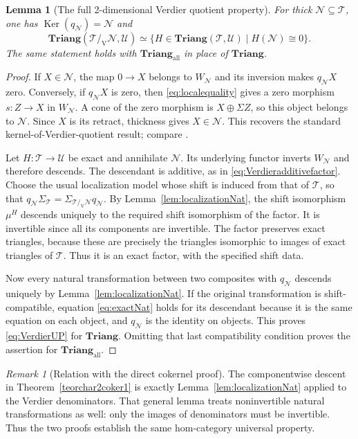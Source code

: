 \documentclass[11pt,reqno,a4paper]{amsart}
\newtheorem{lemma}[theorem]{Lemma}
\theoremstyle{definition}
\theoremstyle{remark}
\newtheorem{remark}[theorem]{Remark}
\newcommand{\N}{\mathcal{N}}
\newcommand{\T}{\mathcal{T}}
\newcommand{\U}{\mathcal{U}}
\newcommand{\0}{\mathbf{0}}
\renewcommand{\1}{\mathbf{1}}
\newcommand{\Triang}{\mathbf{Triang}}
\newcommand{\iso}{\cong}
\newcommand{\Tri}{\Triang}
\newcommand{\TriAll}{\mathbf{Triang}_{\mathrm{all}}}
\newcommand{\vq}[2]{#1/_{\!\mathrm V}#2}
\DeclareMathOperator{\Ker}{Ker}
\begin{document}
\begin{lemma}[The full 2-dimensional Verdier quotient property]\label{lem:VerdierUP}
For thick $\N\subseteq\T$, one has $\Ker(q_{\N})=\N$ and
\begin{equation}\label{eq:VerdierUP}
 \Tri(\vq{\T}{\N},\U)\simeq
 \{H\in\Tri(\T,\U)\mid H(\N)\iso0\}.
\end{equation}
The same statement holds with $\TriAll$ in place of $\Tri$.
\end{lemma}
\begin{proof}
If $X\in\N$, the map $0\to X$ belongs to $W_{\N}$ and its
inversion makes $q_{\N}X$ zero. Conversely, if $q_{\N}X$ is zero,
then \eqref{eq:localequality} gives a zero morphism
$s:Z\to X$ in $W_{\N}$. A cone of the zero morphism is
$X\oplus\Sigma Z$, so this object belongs to $\N$. Since $X$ is
its retract, thickness gives $X\in\N$. This recovers the standard
kernel-of-Verdier-quotient result; compare
\cite[Lemma 13.6.9, Tag 05RK]{StacksTriQuotientKernel}.

Let $H:\T\to\U$ be exact and annihilate $\N$. Its underlying
functor inverts $W_{\N}$ and therefore descends. The descendant is
additive, as in \eqref{eq:Verdieradditivefactor}. Choose the usual
localization model whose shift is induced from that of $\T$, so that
$q_{\N}\Sigma_{\T}=\Sigma_{\vq{\T}{\N}}q_{\N}$.
By Lemma~\ref{lem:localizationNat}, the shift isomorphism $\mu^H$
descends uniquely to the required shift isomorphism of the factor.
It is invertible since all its components are invertible. The factor
preserves exact triangles, because these are precisely the
triangles isomorphic to images of exact triangles of $\T$.
Thus it is an exact factor, with the specified shift data.

Now every natural transformation between two composites with $q_{\N}$
descends uniquely by Lemma~\ref{lem:localizationNat}. If the original
transformation is shift-compatible, equation \eqref{eq:exactNat} holds
for its descendant because it is the same equation on each object,
and $q_{\N}$ is the identity on objects. This proves
\eqref{eq:VerdierUP} for $\Tri$. Omitting that last compatibility
condition proves the assertion for $\TriAll$.
\end{proof}

\begin{remark}[Relation with the direct cokernel proof]
The componentwise descent in Theorem~\ref{teorchar2coker1} is exactly
Lemma~\ref{lem:localizationNat} applied to the Verdier denominators.
That general lemma treats noninvertible natural transformations as
well: only the images of denominators must be invertible. Thus the
two proofs establish the same hom-category universal property.
\end{remark}
\end{document}
